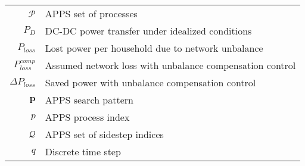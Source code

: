 \begin{scriptsize}
\begin{tabularx}{\textwidth}{r|X}
$\mathcal{P}$                   & APPS set of processes\\
$P_D$                           & DC-DC power transfer under idealized conditions\\
$P_{loss}$                        & Lost power per household due to network unbalance\\
  $P^{comp}_{loss}$                 & Assumed network loss with unbalance compensation control\\
  $\Delta P_{loss}$                 & Saved power with unbalance compensation control\\
  $\textbf{p}$                  & APPS search pattern\\
$p$                             & APPS process index\\


$\mathcal{Q}$                   & APPS set of sidestep indices\\
$q$																& Discrete time step\\


\end{tabularx}
\end{scriptsize}
